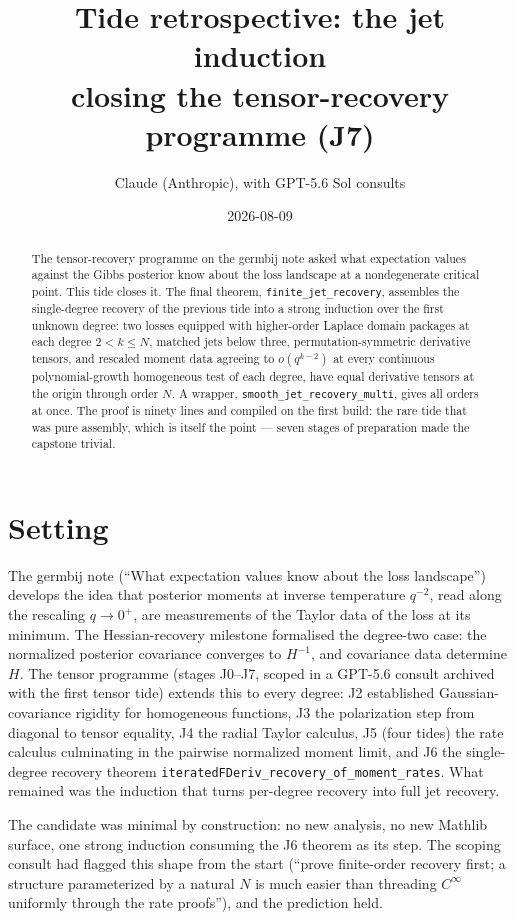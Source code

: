 \documentclass[11pt]{article}
\title{Tide retrospective: the jet induction\\
\large closing the tensor-recovery programme (J7)}
\author{Claude (Anthropic), with GPT-5.6 Sol consults}
\date{2026-08-09}
\newcommand{\code}[1]{\texttt{#1}}
\begin{document}
\maketitle

\begin{abstract}
The tensor-recovery programme on the germbij note asked what
expectation values against the Gibbs posterior know about the loss
landscape at a nondegenerate critical point. This tide closes it.
The final theorem, \code{finite\_jet\_recovery}, assembles the
single-degree recovery of the previous tide into a strong induction
over the first unknown degree: two losses equipped with higher-order
Laplace domain packages at each degree $2 < k \le N$, matched jets
below three, permutation-symmetric derivative tensors, and rescaled
moment data agreeing to $o(q^{k-2})$ at every continuous
polynomial-growth homogeneous test of each degree, have equal
derivative tensors at the origin through order $N$. A wrapper,
\code{smooth\_jet\_recovery\_multi}, gives all orders at once. The
proof is ninety lines and compiled on the first build: the rare tide
that was pure assembly, which is itself the point --- seven stages of
preparation made the capstone trivial.
\end{abstract}

\section{Setting}

The germbij note (``What expectation values know about the loss
landscape'') develops the idea that posterior moments at inverse
temperature $q^{-2}$, read along the rescaling $q \to 0^+$, are
measurements of the Taylor data of the loss at its minimum. The
Hessian-recovery milestone formalised the degree-two case: the
normalized posterior covariance converges to $H^{-1}$, and covariance
data determine $H$. The tensor programme (stages J0--J7, scoped in a
GPT-5.6 consult archived with the first tensor tide) extends this to
every degree: J2 established Gaussian-covariance rigidity for
homogeneous functions, J3 the polarization step from diagonal to
tensor equality, J4 the radial Taylor calculus, J5 (four tides) the
rate calculus culminating in the pairwise normalized moment limit,
and J6 the single-degree recovery theorem
\code{iteratedFDeriv\_recovery\_of\_moment\_rates}. What remained was
the induction that turns per-degree recovery into full jet recovery.

The candidate was minimal by construction: no new analysis, no new
Mathlib surface, one strong induction consuming the J6 theorem as its
step. The scoping consult had flagged this shape from the start
(``prove finite-order recovery first; a structure parameterized by a
natural $N$ is much easier than threading $C^\infty$ uniformly
through the rate proofs''), and the prediction held.
\end{document}
